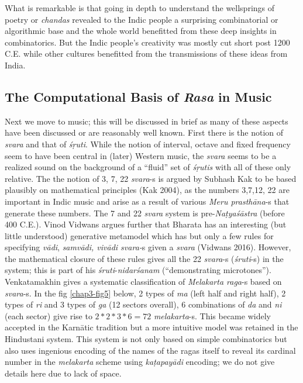 What is remarkable is that going in depth to understand the wellsprings of poetry or \textsl{chandas} revealed to the Indic people a surprising combinatorial or algorithmic base and the whole world benefitted from these deep insights in combinatorics. But the Indic people’s creativity was mostly cut short post 1200 C.E. while other cultures benefitted from the transmissions of these ideas from India.

\subsection{The Computational Basis of \textsl{Rasa} in Music}\label{chap3-sec5.2}

Next we move to music; this will be discussed in brief as many of these aspects have been discussed or are reasonably well known. First there is the notion of \textsl{svara} and that of \textsl{śṛuti}. While the notion of interval, octave and fixed frequency seem to have been central in (later) Western music, the \textsl{svara} seems to be a realized sound on the background of a “fluid” set of \textsl{śṛutis} with all of these only relative. The the notion of 3, 7, 22 \textsl{svara}-s is argued by Subhash Kak to be based plausibly on mathematical principles (Kak 2004), as the numbers 3,7,12, 22 are important in Indic music and arise as a result of various \textsl{Meru prasthāna}-s that generate these numbers. The 7 and 22 \textsl{svara} system is pre-\textsl{Naṭyaśāstra} (before 400 C.E.). Vinod Vidwans argues further that Bharata has an interesting (but little understood) generative metamodel which has but only a few rules for specifying \textsl{vādi}, \textsl{samvādi, vivādi svara-}s given a \textsl{svara} (Vidwans 2016). However, the mathematical closure of these rules gives all the 22 \textsl{svara}-s (\textsl{śruti}-s) in the system; this is part of his \textsl{śruti}-\textsl{nidarśanam} (“demonstrating microtones”). Venkatamakhin gives a systematic classification of \textsl{Melakarta raga}-s based on \textsl{svara}-s. In the fig \ref{chap3-fig5} below, 2 types of \textsl{ma} (left half and right half), 2 types of \textsl{ri} and 3 types of \textsl{ga} (12 sectors overall), 6 combinations of \textsl{da} and \textsl{ni} (each sector) give rise to $2*2*3*6=72$ \textsl{melakarta}-s. This became widely accepted in the Karnātic tradition but a more intuitive model was retained in the Hindustani system. This system is not only based on simple combinatorics but also uses ingenious encoding of the names of the ragas itself to reveal its cardinal number in the \textsl{melakarta} scheme using \textsl{kaṭapayādi} encoding; we do not give details here due to lack of space.

